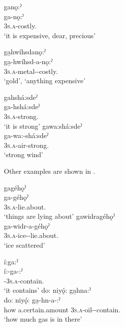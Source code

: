 \ea\label{ex:adjvbppchoicex9} 
\ea ganǫ:ˀ \\
\gll ga-nǫ:ˀ\\
\textsc{3s.a}-costly.{\stative}\\
\glt ‘it is expensive, dear, precious’ 

\ex ga̱hwíhsdanǫ:ˀ \\
\gll ga̱-hwíhsd-a-nǫ:ˀ\\
 \textsc{3s.a}-metal-{\joinerA}-costly.{\stative}\\
\glt ‘gold’, `anything expensive'
\z
\z

\ea\label{ex:adjvbppchoicex10} 
\ea gahshá:sdeˀ\\
\gll ga-hshá:sdeˀ \\
\textsc{3s.a}-strong.{\stative}\\
\glt ‘it is strong’ 
\ex gawa:shá:sdeˀ\\
\gll ga-wa:-shá:sdeˀ\\
 \textsc{3s.a}-air-strong.{\stative}\\
\glt `strong wind'
\z
\z 


Other examples are shown in .
 
\ea\label{ex:positppchoiceex7} 
\ea gagéhǫˀ \\
\gll ga-géhǫˀ\\
\textsc{3s.a}-lie.about.{\stative}\\
\glt ‘things are lying about’ 
\ex gawidragéhǫˀ\\
\gll ga-widr-a-géhǫˀ\\
 \textsc{3s.a}-ice-{\joinerA}-lie.about.{\stative}\\
\glt `ice scattered'
\z
\z

\ea\label{ex:positppchoiceex700} 
\ea í:ga:ˀ \\
\gll í:-ga-:ˀ\\
{\partitive}-\textsc{3s.a}-contain.{\stative}\\
\glt ‘it contains’ 
\ex do: niyǫ́: ga̱hna:ˀ \\
\gll do: niyǫ́: ga̱-hn-a-:ˀ\\
how a.certain.amount \textsc{3s.a}-oil-{\joinerA}-contain.{\stative}\\
\glt ‘how much gas is in there’
\z
\z

